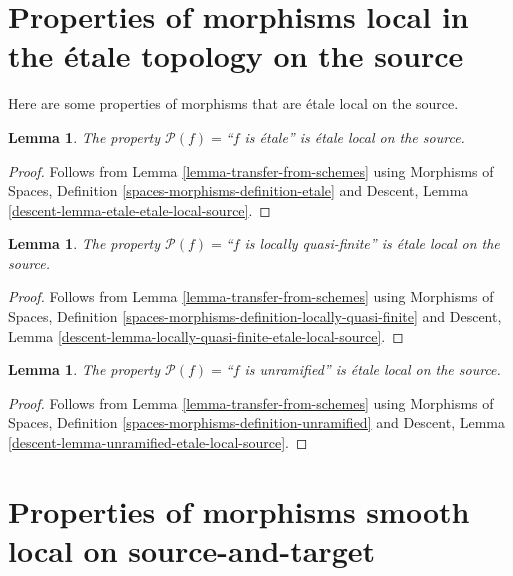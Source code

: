\documentclass{stacks-project}
\theoremstyle{plain}
\newtheorem{lemma}[subsection]{Lemma}
\theoremstyle{definition}
\theoremstyle{remark}
\numberwithin{equation}{subsection}
\begin{document}
\section{Properties of morphisms local in the \'etale topology on the source}
\label{section-etale-local-source}

\noindent
Here are some properties of morphisms that are \'etale local on the source.

\begin{lemma}
\label{lemma-etale-etale-local-source}
The property $\mathcal{P}(f)=$``$f$ is \'etale''
is \'etale local on the source.
\end{lemma}

\begin{proof}
Follows from
Lemma \ref{lemma-transfer-from-schemes}
using
Morphisms of Spaces,
Definition \ref{spaces-morphisms-definition-etale}
and
Descent, Lemma \ref{descent-lemma-etale-etale-local-source}.
\end{proof}

\begin{lemma}
\label{lemma-locally-quasi-finite-etale-local-source}
The property $\mathcal{P}(f)=$``$f$ is locally quasi-finite''
is \'etale local on the source.
\end{lemma}

\begin{proof}
Follows from
Lemma \ref{lemma-transfer-from-schemes}
using
Morphisms of Spaces,
Definition \ref{spaces-morphisms-definition-locally-quasi-finite}
and
Descent, Lemma \ref{descent-lemma-locally-quasi-finite-etale-local-source}.
\end{proof}

\begin{lemma}
\label{lemma-unramified-etale-local-source}
The property $\mathcal{P}(f)=$``$f$ is unramified''
is \'etale local on the source.
\end{lemma}

\begin{proof}
Follows from
Lemma \ref{lemma-transfer-from-schemes}
using
Morphisms of Spaces, Definition \ref{spaces-morphisms-definition-unramified}
and
Descent, Lemma \ref{descent-lemma-unramified-etale-local-source}.
\end{proof}




\section{Properties of morphisms smooth local on source-and-target}
\label{section-properties-local-source-target}
\end{document}
